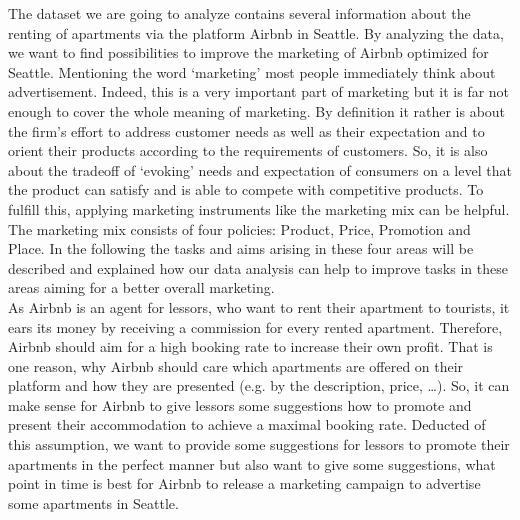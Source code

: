The dataset we are going to analyze contains several information about the renting of apartments via the platform Airbnb in Seattle. By analyzing the data, we want to find possibilities to improve the marketing of Airbnb optimized for Seattle. Mentioning the word ‘marketing’ most people immediately think about advertisement. Indeed, this is a very important part of marketing but it is far not enough to cover the whole meaning of marketing. By definition it rather is about the firm’s effort to address customer needs as well as their expectation and to orient their products according to the requirements of customers. So, it is also about the tradeoff of ‘evoking’ needs and expectation of consumers on a level that the product can satisfy and is able to compete with competitive products. To fulfill this, applying marketing instruments like the marketing mix can be helpful. The marketing mix consists of four policies: Product, Price, Promotion and Place. In the following the tasks and aims arising in these four areas will be described and explained how our data analysis can help to improve tasks in these areas aiming for a better overall marketing.\\As Airbnb is an agent for lessors, who want to rent their apartment to tourists, it ears its money by receiving a commission for every rented apartment. Therefore, Airbnb should aim for a high booking rate to increase their own profit. That is one reason, why Airbnb should care which apartments are offered on their platform and how they are presented (e.g. by the description, price, …). So, it can make sense for Airbnb to give lessors some suggestions how to promote and present their accommodation to achieve a maximal booking rate. Deducted of this assumption, we want to provide some suggestions for lessors to promote their apartments in the perfect manner but also want to give some suggestions, what point in time is best for Airbnb to release a marketing campaign to advertise some apartments in Seattle. 
